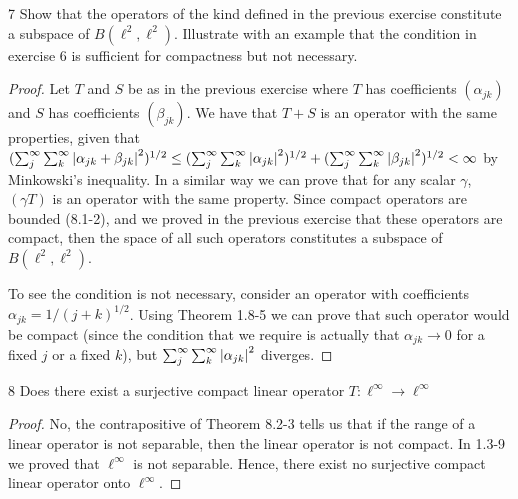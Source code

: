 \begin{exercise}{7}
Show that the operators of the kind defined in the previous exercise constitute a subspace of $B(\ell^2, \ell^2)$.
Illustrate with an example that the condition in exercise 6 is sufficient for compactness but not necessary. 
\end{exercise}
\begin{proof}
Let $T$ and $S$ be as in the previous exercise where $T$ has coefficients $(\alpha_{jk})$ and $S$ has coefficients $(\beta_{jk})$.
We have that $T + S$ is an operator with the same properties, given that $(\sum_j^\infty \sum_k^\infty \left\lvert \alpha_{jk} + \beta_{jk}\right\rvert^2)^{1/2} \leq (\sum_j^\infty \sum_k^\infty \left\lvert \alpha_{jk}\right\rvert^2)^{1/2} + (\sum_j^\infty \sum_k^\infty \left\lvert \beta_{jk}\right\rvert^2)^{1/2} < \infty$ by Minkowski's inequality.
In a similar way we can prove that for any scalar $\gamma$, $(\gamma T)$ is an operator with the same property.
Since compact operators are bounded (8.1-2), and we proved in the previous exercise that these operators are compact, then the space of all such operators constitutes a subspace of $B(\ell^2, \ell^2)$.

To see the condition is not necessary, consider an operator with coefficients $\alpha_{j k} = 1/(j+k)^{1/2}$.
Using Theorem 1.8-5 we can prove that such operator would be compact (since the condition that we require is actually that $\alpha_{j k} \to 0$ for a fixed $j$ or a fixed $k$), but $\sum_j^\infty \sum_k^\infty \left\lvert \alpha_{j k}\right\rvert^2$ diverges.
\end{proof} 

\begin{exercise}{8}
Does there exist a surjective compact linear operator $T: \ell^\infty \to \ell^\infty$
\end{exercise}
\begin{proof}
No, the contrapositive of Theorem 8.2-3 tells us that if the range of a linear operator is not separable, then the linear operator is not compact.
In 1.3-9 we proved that $\ell^\infty$ is not separable.
Hence, there exist no surjective compact linear operator onto $\ell^\infty$.
\end{proof} 

